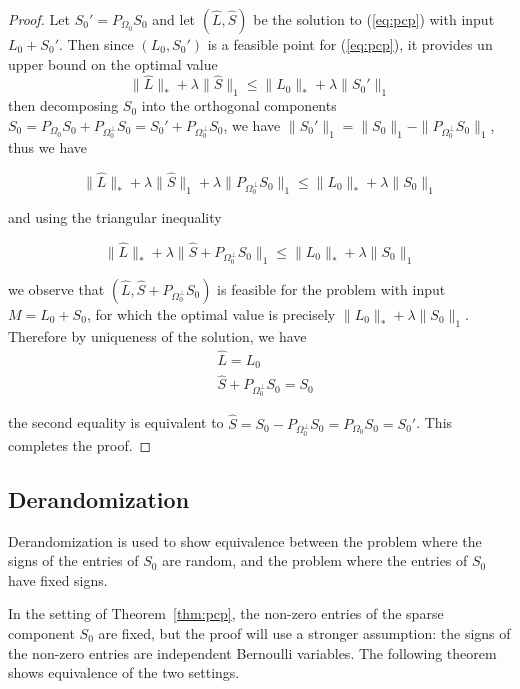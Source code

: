 \begin{proof}
Let $S_0' = P_{\Omega_0} S_0$ and let $(\hat{L}, \hat{S})$ be the solution to (\ref{eq:pcp}) with input $L_0 + S_0'$. Then since $(L_0, S_0')$ is a feasible point for (\ref{eq:pcp}), it provides un upper bound on the optimal value
\[
\|\hat{L}\|_* + \lambda \|\hat{S}\|_1 \leq \|L_0\|_* + \lambda \|S_0'\|_1
\]
then decomposing $S_0$ into the orthogonal components $S_0 = P_{\Omega_0} S_0 + P_{\Omega_0^\perp} S_0 = S_0' + P_{\Omega_0^\perp} S_0$, we have $\|S_0'\|_1 = \|S_0\|_1 - \|P_{\Omega_0^\perp} S_0\|_1$, thus we have

\[
\|\hat{L}\|_* + \lambda \|\hat{S}\|_1 + \lambda \|P_{\Omega_0^\perp} S_0\|_1 \leq \|L_0\|_* + \lambda \|S_0\|_1
\]

and using the triangular inequality

\[
\|\hat{L}\|_* + \lambda \|\hat{S} + P_{\Omega_0^\perp} S_0\|_1 \leq \|L_0\|_* + \lambda \|S_0\|_1
\]

we observe that $(\hat{L}, \hat{S} + P_{\Omega_0^\perp} S_0)$ is feasible for the problem with input $M = L_0 + S_0$, for which the optimal value is precisely $\|L_0\|_* + \lambda \|S_0\|_1$. Therefore by uniqueness of the solution, we have
\[
\begin{aligned}
&\hat{L} = L_0 \\
&\hat{S} + P_{\Omega_0^\perp} S_0 = S_0
\end{aligned}
\]

the second equality is equivalent to $\hat{S} = S_0 - P_{\Omega_0^\perp} S_0 = P_{\Omega_0} S_0 = S_0'$. This completes the proof.
\end{proof}


\subsection{Derandomization}
Derandomization is used to show equivalence between the problem where the signs of the entries of $S_0$ are random, and the problem where the entries of $S_0$ have fixed signs.

In the setting of Theorem~\ref{thm:pcp}, the non-zero entries of the sparse component $S_0$ are fixed, but the proof will use a stronger assumption: the signs of the non-zero entries are independent Bernoulli variables. The following theorem shows equivalence of the two settings.

